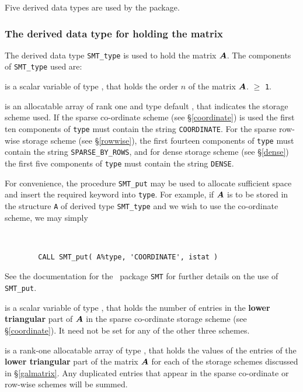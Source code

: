 \documentclass{galahad}
\begin{document}
\galtypes
Five derived data types are used by the package.


\subsubsection{The derived data type for holding the matrix}\label{typeprob}
The derived data type {\tt SMT\_type} is used to hold the matrix ${\bm{A}}$.
The components of {\tt SMT\_type} used are:

\begin{description}

 is a scalar variable of type \integer, that holds
the order $n$ of the matrix  ${\bm{A}}$.
 $\geq$ {\tt 1}.

 is an allocatable array of rank one and type default \character, that
indicates the storage scheme used. If the
sparse co-ordinate scheme (see \S\ref{coordinate}) is used
the first ten components of {\tt type} must contain the
string {\tt COORDINATE}.
For the sparse row-wise storage scheme (see \S\ref{rowwise}),
the first fourteen components of {\tt type} must contain the
string {\tt SPARSE\_BY\_ROWS}, and
for dense storage scheme (see \S\ref{dense})
the first five components of {\tt type} must contain the
string {\tt DENSE}.

For convenience, the procedure {\tt SMT\_put}
may be used to allocate sufficient space and insert the required keyword
into {\tt type}.
For example, if ${\bm{A}}$ is to be stored in the structure {\tt A}
of derived type {\tt SMT\_type} and we wish to use
the co-ordinate scheme, we may simply
{\tt
\begin{verbatim}
        CALL SMT_put( A%type, 'COORDINATE', istat )
\end{verbatim}
}
\noindent
See the documentation for the \galahad\ package {\tt SMT}
for further details on the use of {\tt SMT\_put}.

 is a scalar variable of type \integer, that
holds the number of entries in the {\bf lower triangular} part of ${\bm{A}}$
in the sparse co-ordinate storage scheme (see \S\ref{coordinate}).
It need not be set for any of the other three schemes.

 is a rank-one allocatable array of type \realdp, that holds
the values of the entries of the {\bf lower triangular} part
of the matrix ${\bm{A}}$ for each of the
storage schemes discussed in \S\ref{galmatrix}.
Any duplicated entries that appear in the sparse
co-ordinate or row-wise schemes will be summed.


\end{description}
\end{document}
